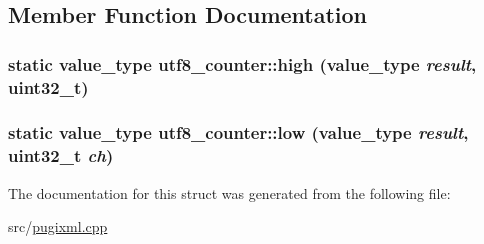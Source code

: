 \subsection{Member Function Documentation}
\hypertarget{structutf8__counter_ab16e675980a15e1ede2e4cd18d19f7b1}{
\subsubsection[{high}]{\setlength{\rightskip}{0pt plus 5cm}static {\bf value\_\-type} utf8\_\-counter::high ({\bf value\_\-type} {\em result}, \/  uint32\_\-t)}}
\label{structutf8__counter_ab16e675980a15e1ede2e4cd18d19f7b1}
\hypertarget{structutf8__counter_a0950643189089175ae0eac9b4193534d}{
\subsubsection[{low}]{\setlength{\rightskip}{0pt plus 5cm}static {\bf value\_\-type} utf8\_\-counter::low ({\bf value\_\-type} {\em result}, \/  uint32\_\-t {\em ch})}}
\label{structutf8__counter_a0950643189089175ae0eac9b4193534d}


The documentation for this struct was generated from the following file:\begin{DoxyCompactItemize}
\item 
src/\hyperlink{pugixml_8cpp}{pugixml.cpp}\end{DoxyCompactItemize}
